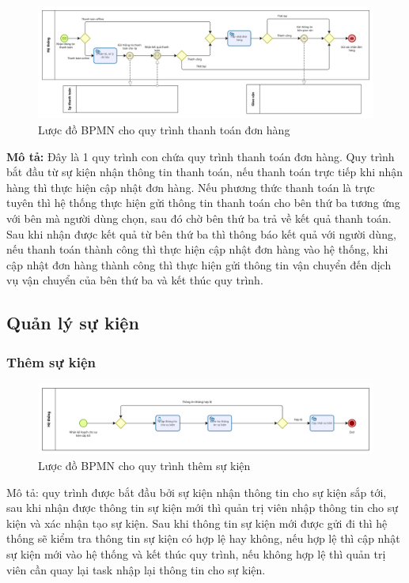     \begin{figure}[!htp]
        \centering
        \includegraphics[width=15cm]{img/BPMN/customer_buy/customer_payment.png}
        \newline
        \caption{Lược đồ BPMN cho quy trình thanh toán đơn hàng}
    \end{figure}
    \textbf{Mô tả:} Đây là 1 quy trình con chứa quy trình thanh toán đơn hàng. Quy trình bắt đầu từ sự kiện nhận thông tin thanh toán, nếu thanh toán trực tiếp khi nhận hàng thì thực hiện cập nhật đơn hàng. Nếu phương thức thanh toán là trực tuyên thì hệ thống thực hiện gửi thông tin thanh toán cho bên thứ ba tương ứng với bên mà người dùng chọn, sau đó chờ bên thứ ba trả về kết quả thanh toán. Sau khi nhận được kết quả từ bên thứ ba thì thông báo kết quả với người dùng, nếu thanh toán thành công thì thực hiện cập nhật đơn hàng vào hệ thống, khi cập nhật đơn hàng thành công thì thực hiện gửi thông tin vận chuyển đến dịch vụ vận chuyển của bên thứ ba và kết thúc quy trình.
 

\newpage
\subsection{Quản lý sự kiện}

\subsubsection{Thêm sự kiện}

\begin{figure}[!htp]
    \centering
    \includegraphics[width=14cm]{img/BPMN/event/add_event.png}
    \newline
    \caption{Lược đồ BPMN cho quy trình thêm sự kiện}
\end{figure}
Mô tả: quy trình được bắt đầu bởi sự kiện nhận thông tin cho sự kiện sắp tới, sau khi nhận được thông tin sự kiện mới thì quản trị viên nhập thông tin cho sự kiện và xác nhận tạo sự kiện. Sau khi thông tin sự kiện mới được gửi đi thì hệ thống sẽ kiểm tra thông tin sự kiện có hợp lệ hay không, nếu hợp lệ thì cập nhật sự kiện mới vào hệ thống và kết thúc quy trình, nếu không hợp lệ thì quản trị viên cần quay lại task nhập lại thông tin cho sự kiện.

